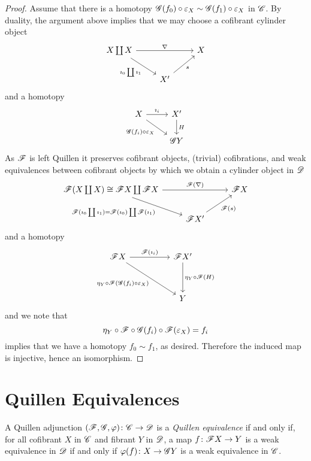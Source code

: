 \documentclass[10pt]{amsart}
\begin{document}
\begin{lem}
\begin{proof}
    Assume that there is a homotopy $\mathscr{G}(f_0) \circ \varepsilon_X \sim \mathscr{G}(f_1) \circ \varepsilon_X$ in $\mathscr{C}$.
    By duality, the argument above implies that we may choose a cofibrant cylinder object
    $$\begin{tikzcd}
      X \coprod X \arrow{rr}{\nabla}\arrow[swap]{rd}{\imath_0 \coprod \imath_1} && X\\
      & X^\prime \arrow[swap]{ur}{s}
    \end{tikzcd}$$
    and a homotopy
    $$\begin{tikzcd}
      X \arrow{r}{\imath_i}\arrow[swap]{rd}{\G(f_i) \circ \varepsilon_X} & X^\prime \arrow{d}{H}\\
      & \G Y
    \end{tikzcd}$$
    As $\mathscr{F}$ is left Quillen it preserves cofibrant objects, (trivial) cofibrations, and weak equivalences between cofibrant objects by which we obtain a cylinder object in $\mathscr{D}$
    $$\begin{tikzcd}
      \F (X \coprod X) \cong \F X \coprod \F X \arrow[swap]{rd}{\F(\imath_0 \coprod \imath_1) = \F(\imath_0) \coprod \F(\imath_1)}\arrow{rr}{\F(\nabla)} && \F X\\
      & \F X^\prime \arrow[swap]{ur}{\F(s)}
    \end{tikzcd}$$
    and a homotopy
    $$\begin{tikzcd}
      \F X \arrow[swap]{rrdd}{\eta_Y \circ \F (\G(f_i) \circ \varepsilon_X)} \arrow{rr}{\F(\imath_i)} & & \F X^\prime \arrow{dd}{\eta_Y \circ \F(H)}\\
      \\
      & & Y
    \end{tikzcd}$$
    and we note that 
    $$\eta_Y \circ \mathscr{F} \circ \mathscr{G}(f_i) \circ \mathscr{F}(\varepsilon_X) = f_i$$
    implies that we have a homotopy $f_0 \sim f_1$, as desired.
    Therefore the induced map is injective, hence an isomorphism.
  \end{proof}
\end{lem}

\section{Quillen Equivalences}
\begin{defn}
  A Quillen adjunction $(\mathscr{F}, \mathscr{G}, \varphi) \colon \mathscr{C} \to \mathscr{D}$ is a {\it Quillen equivalence} if and only if, for all cofibrant $X$ in $\mathscr{C}$ and fibrant $Y$ in $\mathscr{D}$, a map $f \colon \mathscr{F} X \to Y$ is a weak equivalence in $\mathscr{D}$ if and only if $\varphi(f) \colon X \to \mathscr{G} Y$ is a weak equivalence in $\mathscr{C}$.
\end{defn}
\end{document}
